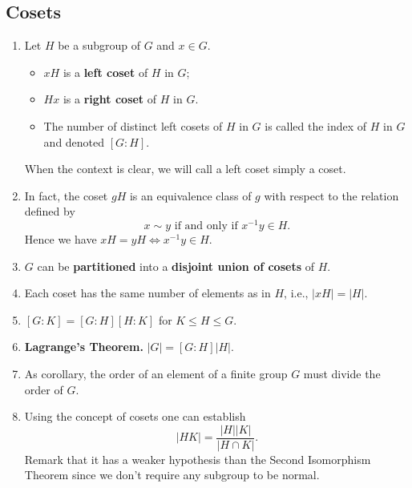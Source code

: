 \subsection*{Cosets}
\begin{enumerate}[(1)]
	\item Let $H$ be a subgroup of $G$ and $x\in G$. 
	\begin{itemize}
		\item $xH$ is a \textbf{left coset} of $H$ in $G$;
		\item $Hx$ is a \textbf{right coset} of $H$ in $G$.
		\item The number of distinct left cosets of $H$ in $G$ is called the index of $H$ in $G$ and denoted $[G:H]$.
	\end{itemize}
	When the context is clear, we will call a left coset simply a coset.
	\item In fact, the coset $gH$ is an equivalence class of $g$ with respect to the relation defined by 
	\begin{equation*}
		x\sim y \text{ if and only if } x^{-1}y\in H.
	\end{equation*} Hence we have $xH = yH\Leftrightarrow x^{-1}y\in H$.
	\item $G$ can be \textbf{partitioned} into a \textbf{disjoint union of cosets} of $H$.
	\item Each coset has the same number of elements as in $H$, i.e., $|xH| = |H|$.
	\item $[G:K] = [G:H][H:K]$ for $K\leq H\leq G$.
	\item \textbf{Lagrange's Theorem.} $|G| = [G:H]|H|$.
	\item As corollary, the order of an element of a finite group $G$ must divide the order of $G$.
	\item Using the concept of cosets one can establish 
	\begin{equation*}
		|HK| = \frac{|H||K|}{|H\cap K|}.
	\end{equation*}
	Remark that it has a weaker hypothesis than the Second Isomorphism Theorem since we don't require any subgroup to be normal.
\end{enumerate}